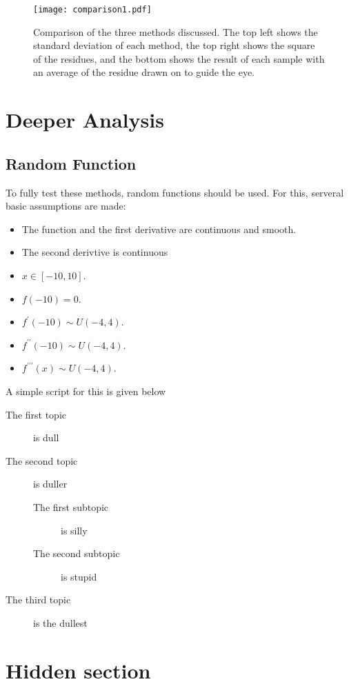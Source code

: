 \begin{figure}[htbp!] 
  \centering    
  \texttt{[image: comparison1.pdf]}
  \caption[First Comparison]{Comparison of the three methods discussed. The top left shows the standard deviation of each method, the top right shows the square of the residues, and the bottom shows the result of each sample with an average of the residue drawn on to guide the eye.}
  \label{fig:firstComparison}
\end{figure}

\section{Deeper Analysis}
\subsection{Random Function}
To fully test these methods, random functions should be used. For this, serveral basic assumptions are made:
\begin{itemize}
  \item The function and the first derivative are continuous and smooth.
  \item The second derivtive is continuous
  \item $x\in[-10, 10]$.
  \item $f(-10)=0$.
  \item $f^{\prime}(-10)\sim U(-4, 4)$.
  \item $f^{\prime\prime}(-10)\sim U(-4, 4)$.
  \item $f^{\prime\prime\prime}(x)\sim U(-4, 4)$.
\end{itemize}
A simple script for this is given below
\begin{description}
\item[The first topic] is dull
\item[The second topic] is duller
\begin{description}
\item[The first subtopic] is silly
\item[The second subtopic] is stupid
\end{description}
\item[The third topic] is the dullest
\end{description}


\clearpage

\tochide\section{Hidden section}



